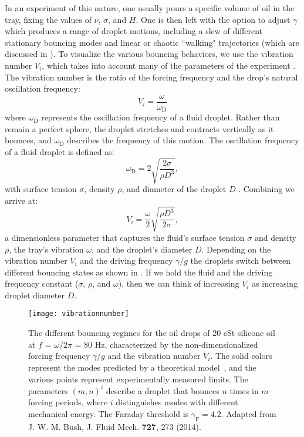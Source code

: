 In an experiment of this nature, one usually pours a specific volume of oil in the tray, fixing the values of $\nu$, $\sigma$, and $H$. One is then left with the option to adjust $\gamma$ which produces a range of droplet motions, including a slew of different stationary bouncing modes and linear or chaotic ``walking" trajectories (which are discussed in ). To visualize the various bouncing behaviors, we use the vibration number $V_i$, which takes into account many of the parameters of the experiment . The vibration number is the ratio of the forcing frequency and the drop's natural oscillation frequency:
\begin{equation} \label{vibrationnumber1}
V_i = \frac{\omega}{\omega_\mathrm{D}}
\end{equation}   
where $\omega_\mathrm{D}$ represents the oscillation frequency of a fluid droplet. Rather than remain a perfect sphere, the droplet stretches and contracts vertically as it bounces, and $\omega_\mathrm{D}$ describes the frequency of this motion. The oscillation frequency of a fluid droplet is defined as:
\begin{equation} \label{oscillationfrequency}
\omega_\mathrm{D} = 2\sqrt{\frac{2\sigma}{\rho D^3}},
\end{equation}   
with surface tension $\sigma$, density $\rho$, and diameter of the droplet $D$ . Combining  we arrive at:
\begin{equation} \label{vibrationnumber2}
V_i = \frac{\omega}{2}\sqrt{\frac{\rho D^3}{2\sigma}},
\end{equation}   	       	       
a dimensionless parameter that captures the fluid's surface tension $\sigma$ and density $\rho$, the tray's vibration $\omega$, and the droplet's diameter $D$. Depending on the vibration number $V_i$ and the driving frequency $\gamma/g$ the droplets switch between different bouncing states as shown in . If we hold the fluid and the driving frequency constant ($\sigma$, $\rho$, and $\omega$), then we can think of increasing $V_i$ as increasing droplet diameter $D$. 
	    
	    \begin{figure}[h]
	       \centering
	    \texttt{[image: vibrationnumber]}
	     \caption{The different bouncing regimes for the oil drops of 20 cSt silicone oil at $f$ = $\omega / 2\pi$ = 80 Hz, characterized by the non-dimensionalized forcing frequency $\gamma/g$ and the vibration number $V_i$. The solid colors represent the  modes predicted by a theoretical model~, and the various points represent experimentally measured limits. The parameters $(m,n)^{i}$ describe a droplet that bounces $n$ times in $m$ forcing periods, where $i$ distinguishes modes with different mechanical energy. The Faraday threshold is $\gamma_\mathrm{F} = 4.2$. Adapted from J. W. M. Bush, J. Fluid Mech. \textbf{727}, 273 (2014).}
	 \label{regime}
	\end{figure}

